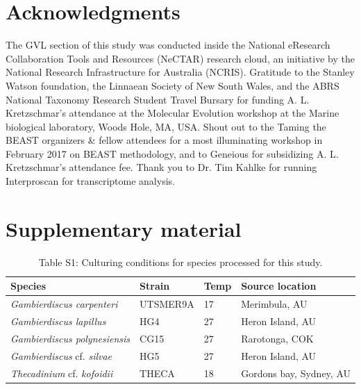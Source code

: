 \documentclass[12pt]{article}
\begin{document}
\section{Acknowledgments}
The GVL section of this study was conducted inside the National eResearch Collaboration Tools and Resources (NeCTAR) research cloud, an initiative by the National Research Infrastructure for Australia (NCRIS).
Gratitude to the Stanley Watson foundation, the Linnaean Society of New South Wales, and the ABRS National Taxonomy Research Student Travel Bursary for funding A. L. Kretzschmar's attendance at the Molecular Evolution workshop at the Marine biological laboratory, Woods Hole, MA, USA.
Shout out to the Taming the BEAST organizers \& fellow attendees for a most illuminating workshop in February 2017 on BEAST methodology, and to Geneious for subsidizing A. L. Kretzschmar's attendance fee.
Thank you to Dr. Tim Kahlke for running Interproscan for transcriptome analysis.
\section{Supplementary material}
\FloatBarrier
\begin{table}
\caption{Table S1: Culturing conditions for species processed for this study.}
\begin{tabular}{ | p{3cm} | p{2.5cm} | p{1.5cm} | p{5.3cm} |}
\hline
\textbf{Species} & \textbf{Strain}& \textbf{Temp} & \textbf{Source location} \\
\hline
\textit{Gambierdiscus carpenteri}&UTSMER9A&17&Merimbula, AU\\
\hline
\textit{Gambierdiscus lapillus}&HG4&27&Heron Island, AU\\
\hline
\textit{Gambierdiscus polynesiensis}&CG15&27&Rarotonga, COK\\
\hline
\textit{Gambierdiscus} cf. \textit{silvae}&HG5&27&Heron Island, AU\\
\hline
\textit{Thecadinium} cf. \emph{kofoidii}&THECA&18&Gordons bay, Sydney, AU\\
\hline
\end{tabular}
\end{table}
\FloatBarrier
\end{document}
